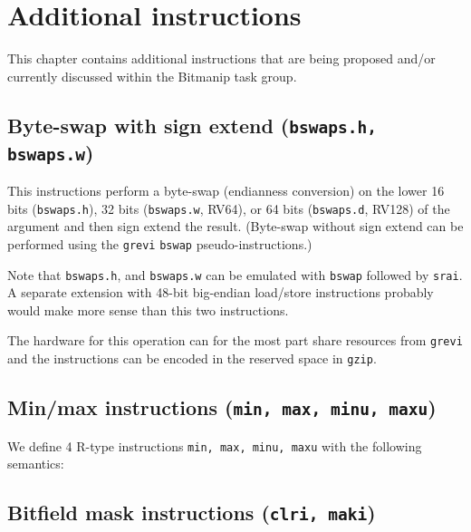 \chapter{Additional instructions}

This chapter contains additional instructions that are being proposed and/or
currently discussed within the Bitmanip task group.


\section{Byte-swap with sign extend (\texttt{bswaps.h, bswaps.w})}

This instructions perform a byte-swap (endianness conversion) on the lower 16 bits
(\texttt{bswaps.h}), 32 bits (\texttt{bswaps.w}, RV64), or 64 bits (\texttt{bswaps.d}, RV128)
of the argument and then sign extend the result. (Byte-swap without sign extend can be
performed using the \texttt{grevi} \texttt{bswap} pseudo-instructions.)

Note that \texttt{bswaps.h}, and \texttt{bswaps.w} can be emulated with
\texttt{bswap} followed by \texttt{srai}. A separate extension with 48-bit big-endian
load/store instructions probably would make more sense than this two instructions.



The hardware for this operation can for the most part share resources from
\texttt{grevi} and the instructions can be encoded in the reserved space in \texttt{gzip}.




\section{Min/max instructions (\texttt{min, max, minu, maxu})}

We define 4 R-type instructions \texttt{min, max, minu, maxu} with the
following semantics:






\section{Bitfield mask instructions (\texttt{clri, maki})}

